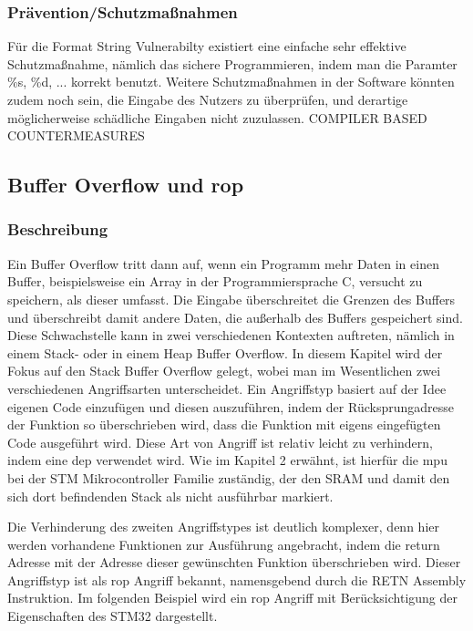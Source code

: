 \documentclass[a4paper,
DIV=13,
12pt,
BCOR=10mm,
department=FakIM,
oneside,
parskip=half,
automark,
listof=totocnumbered,
bibliography=totocnumbered,
acronym=totocnumbered
] {OTHRartcl}
\begin{document}
\subsubsection{Prävention/Schutzmaßnahmen}
Für die Format String Vulnerabilty existiert eine einfache sehr effektive Schutzmaßnahme, nämlich
das sichere Programmieren, indem man die Paramter \%s, \%d, ... korrekt benutzt.
Weitere Schutzmaßnahmen in der Software könnten zudem noch sein, die Eingabe des Nutzers zu überprüfen, und
derartige möglicherweise schädliche Eingaben nicht zuzulassen.
COMPILER BASED COUNTERMEASURES

\subsection{Buffer Overflow und \ac{rop}}
\subsubsection{Beschreibung}
Ein Buffer Overflow tritt dann auf, wenn ein Programm mehr Daten in einen Buffer, beispielsweise ein Array in der Programmiersprache C, versucht zu speichern, als
dieser umfasst.
Die Eingabe überschreitet die Grenzen des Buffers und überschreibt damit andere Daten, die außerhalb des Buffers gespeichert sind.
Diese Schwachstelle kann in zwei verschiedenen Kontexten auftreten, nämlich in einem Stack- oder in einem Heap Buffer Overflow.
In diesem Kapitel wird der Fokus auf den Stack Buffer Overflow gelegt, wobei man im Wesentlichen zwei verschiedenen Angriffsarten unterscheidet.
Ein Angriffstyp basiert auf der Idee eigenen Code einzufügen und diesen auszuführen, indem der Rücksprungadresse der Funktion so überschrieben wird, dass die Funktion
mit eigens eingefügten Code ausgeführt wird. Diese Art von Angriff ist relativ leicht zu verhindern, indem eine \ac{dep} verwendet wird.
Wie im Kapitel 2 erwähnt, ist hierfür die \ac*{mpu} bei der STM Mikrocontroller Familie zuständig, der den SRAM und damit den sich dort befindenden Stack als nicht ausführbar markiert.

Die Verhinderung des zweiten Angriffstypes ist deutlich komplexer, denn hier werden vorhandene Funktionen zur Ausführung angebracht, indem die return Adresse mit der Adresse
dieser gewünschten Funktion überschrieben wird. %
Dieser Angriffstyp ist als \ac*{rop} Angriff bekannt, namensgebend durch die RETN Assembly Instruktion.
Im folgenden Beispiel wird ein \ac*{rop} Angriff mit Berücksichtigung der Eigenschaften des STM32 dargestellt.
\end{document}
